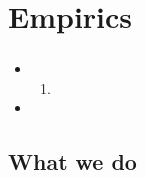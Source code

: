 \documentclass[handout,compress,mathserif]{beamer}
\newcounter{perc}
\newcounter{percek}
\begin{document}
\section{Empirics}

\begin{frame}\frametitle{}
    
\begin{itemize}[<+->]
    \item
    \begin{enumerate}[<+->]
        \item
    \end{enumerate}
    \item
\end{itemize}
\end{frame}




\addtocounter{percek}{9}

\subsection{What we do}
\end{document}

